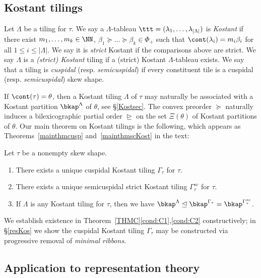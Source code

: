 \subsection{Kostant tilings}\label{Kosint}
Let \(\Lambda\) be a tiling for \(\tau\). We say a \(\Lambda\)-tableau \(\ttt = (\lambda_1, \ldots, \lambda_{|\Lambda|})\) is {\em Kostant} if there exist \(m_1, \ldots, m_k \in \NN\), \(\beta_1\succeq \ldots \succeq \beta_k \in \Phi_+\) such that \(\cont(\lambda_i) = m_i \beta_i\) for all \(1 \leq i \leq |\Lambda|\). We say it is {\em strict} Kostant if the comparisons above are strict. We say \(\Lambda\) is a {\em (strict) Kostant} tiling if a (strict) Kostant \(\Lambda\)-tableau exists. We say that a tiling is {\em cuspidal} (resp. {\em semicuspidal}) if every constituent tile is a cuspidal (resp. {\em semicuspidal}) skew shape. 

If \(\cont(\tau) = \theta\), then a Kostant tiling \(\Lambda\) of \(\tau\) may naturally be associated with a Kostant partition \(\bkap^\Lambda\) of \(\theta\), see \S\ref{Kostsec}. The convex preorder \(\succeq\) naturally induces a bilexicographic partial order \(\trianglerighteq\) on the set \(\Xi(\theta)\) of Kostant partitions of \(\theta\). Our main theorem on Kostant tilings is the following, which appears as Theorems~\ref{mainthmcusp} and~\ref{mainthmscKost} in the text:

\begin{introtheorem}\label{THMC}
Let \(\tau\) be a nonempty skew shape.
\begin{enumerate}
\item There exists a unique cuspidal Kostant tiling \(\Gamma_\tau\) for \(\tau\). \label{cond:C1}
\item There exists a unique semicuspidal strict Kostant tiling \(\Gamma^{sc}_\tau\) for \(\tau\). \label{cond:C2}
\item If \(\Lambda\) is any Kostant tiling for \(\tau\), then we have \( \bkap^{\Lambda} \trianglelefteq \bkap^{\Gamma_\tau} = \bkap^{\Gamma^{sc}_\tau} \). \label{cond:C3}
\end{enumerate}
\end{introtheorem}

We establish existence in Theorem~\ref{THMC}\eqref{cond:C1},\eqref{cond:C2} constructively;
in \S\ref{resKos} we show the cuspidal Kostant tiling \(\Gamma_\tau\) may be constructed via progressive removal of {\em minimal ribbons}.

\subsection{Application to representation theory} 

